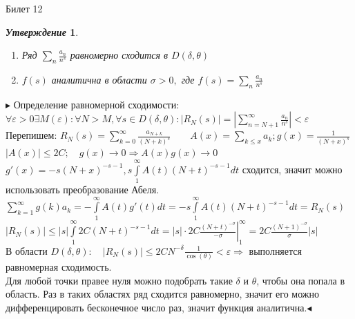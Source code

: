 \documentclass[a4paper,12pt]{article}
\newtheorem{utv}{\textit{Утверждение}}
\newcommand{\TE}{\theta}
\newcommand{\q}{\quad}
\newcommand{\pb}{\blacktriangleright}
\newcommand{\pe}{\blacktriangleleft}
\newcommand{\Ra}{\Rightarrow}
\newcommand{\SL}{\sum\limits}
\newcommand{\IL}{\int\limits}
\begin{document}
\begin{mybox2}{\hypertarget{bil12}{Билет 12}}
\begin{formbox}{}
\begin{utv}\q\\
\begin{enumerate}
\item Ряд $\SL_n \frac{a_n}{n^s} $ равномерно сходится в $D(\delta, \TE)$
\item $f(s)$ аналитична в области $\sigma > 0,$ где $f(s) = \SL_n\frac{a_n}{n^s}$
\end{enumerate}
\end{utv}
\end{formbox}
$\pb$ Определение равномерной сходимости: $\forall \varepsilon > 0 \exists M(\varepsilon): \forall N > M, \forall s\in D(\delta, \TE): \left|R_N(s)\right| = \left|\SL_{n = N+1}^\infty \frac{a_n}{n^s}\right| < \varepsilon$\\
Перепишем: $R_N(s) = \SL_{k=0}^\infty \frac{a_{N+k}}{(N+k)^s}\q\q A(x) = \SL_{k\le x}a_k; g(x) = \frac{1}{(N+x)^s}$\\
$|A(x)| \le 2C; \q g(x) \to 0\Ra A(x)g(x)\to0$\\
$g'(x) = -s(N+x)^{-s-1}, s\IL_1^\infty A(t)(N+t)^{-s-1}dt $ сходится, значит можно использовать преобразование Абеля.\\
$\SL_{k=1}^\infty g(k) a_k = -\IL_1^\infty A(t) g'(t) dt = -s\IL_1^\infty A(t)(N+t)^{-s-1}dt = R_N(s) $\\
$\left|R_N(s)\right| \le |s|\IL_1^\infty 2C(N+t)^{-s-1}dt = |s| \cdot 2C\left.\frac{(N+t)^{-\sigma}}{-\sigma}\right|_1^\infty = 2C\frac{(N+1)^{-\sigma}}{\sigma}|s|$\\
В области $D(\delta, \TE): \q \left|R_N(s)\right|\le 2CN^{-\delta}\frac{1}{\cos(\TE)} < \varepsilon \Ra$ выполняется равномерная сходимость.\\
Для любой точки правее нуля можно подобрать такие $\delta$ и $\TE$, чтобы она попала в область. Раз в таких областях ряд сходится равномерно, значит его можно дифференцировать бесконечное число раз, значит функция аналитична.$\pe$

\end{mybox2}
\end{document}
